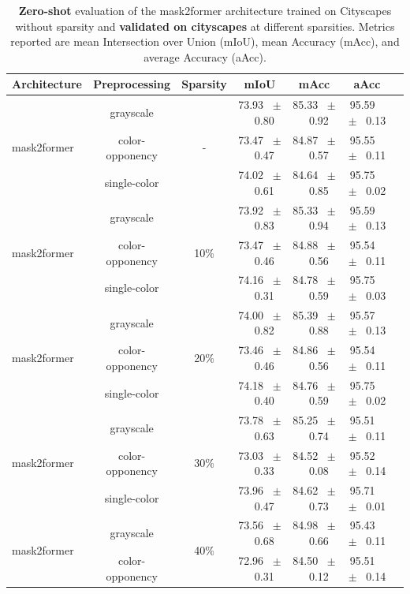 \begin{table}[h]
  \centering
  \caption{\textbf{Zero-shot} evaluation of the mask2former architecture trained on Cityscapes without sparsity and \textbf{validated on cityscapes} at different sparsities. Metrics reported are mean Intersection over Union (mIoU), mean Accuracy (mAcc), and average Accuracy (aAcc).}
  \begin{tabular}{@{}lccc ccc@{}}
    \toprule
    Architecture & Preprocessing & Sparsity & mIoU & mAcc & aAcc \\
    \midrule
    \multirow{3}{*}{mask2former} & grayscale & \multirow{3}{*}{-} & 73.93 ~$\pm$~ 0.80 & 85.33 ~$\pm$~ 0.92 & 95.59 ~$\pm$~ 0.13 \\
    & color-opponency &  & 73.47 ~$\pm$~ 0.47 & 84.87 ~$\pm$~ 0.57 & 95.55 ~$\pm$~ 0.11 \\
    & single-color &  & 74.02 ~$\pm$~ 0.61 & 84.64 ~$\pm$~ 0.85 & 95.75 ~$\pm$~ 0.02 \\
    \midrule
    \multirow{3}{*}{mask2former} & grayscale & \multirow{3}{*}{10\%} & 73.92 ~$\pm$~ 0.83 & 85.33 ~$\pm$~ 0.94 & 95.59 ~$\pm$~ 0.13 \\
    & color-opponency &  & 73.47 ~$\pm$~ 0.46 & 84.88 ~$\pm$~ 0.56 & 95.54 ~$\pm$~ 0.11 \\
    & single-color &  & 74.16 ~$\pm$~ 0.31 & 84.78 ~$\pm$~ 0.59 & 95.75 ~$\pm$~ 0.03 \\
    \midrule
    \multirow{3}{*}{mask2former} & grayscale & \multirow{3}{*}{20\%} & 74.00 ~$\pm$~ 0.82 & 85.39 ~$\pm$~ 0.88 & 95.57 ~$\pm$~ 0.13 \\
    & color-opponency &  & 73.46 ~$\pm$~ 0.46 & 84.86 ~$\pm$~ 0.56 & 95.54 ~$\pm$~ 0.11 \\
    & single-color &  & 74.18 ~$\pm$~ 0.40 & 84.76 ~$\pm$~ 0.59 & 95.75 ~$\pm$~ 0.02 \\
    \midrule
    \multirow{3}{*}{mask2former} & grayscale & \multirow{3}{*}{30\%} & 73.78 ~$\pm$~ 0.63 & 85.25 ~$\pm$~ 0.74 & 95.51 ~$\pm$~ 0.11 \\
    & color-opponency &  & 73.03 ~$\pm$~ 0.33 & 84.52 ~$\pm$~ 0.08 & 95.52 ~$\pm$~ 0.14 \\
    & single-color &  & 73.96 ~$\pm$~ 0.47 & 84.62 ~$\pm$~ 0.73 & 95.71 ~$\pm$~ 0.01 \\
    \midrule
    \multirow{3}{*}{mask2former} & grayscale & \multirow{3}{*}{40\%} & 73.56 ~$\pm$~ 0.68 & 84.98 ~$\pm$~ 0.66 & 95.43 ~$\pm$~ 0.11 \\
    & color-opponency &  & 72.96 ~$\pm$~ 0.31 & 84.50 ~$\pm$~ 0.12 & 95.51 ~$\pm$~ 0.14 \\

\end{tabular}
\end{table}
